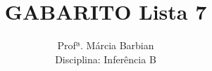 \documentclass[10pt,brazil,addpoints]{exam}
\begin{document}
\title{GABARITO Lista 7}


\author{
  Profª. Márcia Barbian \\
  Disciplina: Inferência B\\
  \date{}
}


\maketitle
\end{document}
